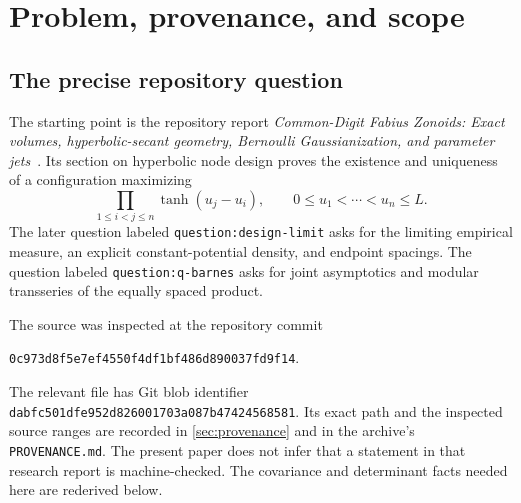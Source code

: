 \documentclass[11pt,a4paper]{article}
\theoremstyle{definition}
\theoremstyle{remark}
\newcommand{\repoid}{\texttt{0c973d8f5e7ef4550f4df1bf486d890037fd9f14}}
\begin{document}
\setcounter{tocdepth}{1}
\tableofcontents
\newpage

\section{Problem, provenance, and scope}
\label{sec:scope}

\subsection{The precise repository question}
The starting point is the repository report \emph{Common-Digit Fabius Zonoids:
Exact volumes, hyperbolic-secant geometry, Bernoulli Gaussianization, and
parameter jets}~\cite{repo}. Its section on hyperbolic node design proves the
existence and uniqueness of a configuration maximizing
\begin{equation}
 \prod_{1\le i<j\le n}\tanh(u_j-u_i),
 \qquad 0\le u_1<\cdots<u_n\le L.
 \label{eq:product}
\end{equation}
The later question labeled \texttt{question:design-limit} asks for the limiting
empirical measure, an explicit constant-potential density, and endpoint
spacings. The question labeled \texttt{question:q-barnes} asks for joint
asymptotics and modular transseries of the equally spaced product.

The source was inspected at the repository commit
\begin{center}\small\repoid.\end{center}
The relevant file has Git blob identifier
\texttt{dabfc501dfe952d826001703a087b47424568581}. Its exact path and the
inspected source ranges are recorded in \cref{sec:provenance} and in the
archive's \texttt{PROVENANCE.md}. The present paper does not infer that a
statement in that research report is machine-checked. The covariance and
determinant facts needed here are rederived below.
\end{document}
